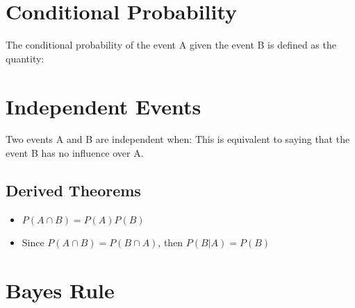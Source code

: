 \section{Conditional Probability}
The conditional probability of the event A given the event B is defined as the quantity:

\section{Independent Events}
Two events A and B are independent when:
 This is equivalent to saying that the event B has no influence over A.
\subsection{Derived Theorems}
\begin{itemize}
  \item $P(A \cap B) = P(A)P(B)$
  \item Since $P(A \cap B) = P(B \cap A)$, then $P(B|A) = P(B)$
\end{itemize}

\section{Bayes Rule}


% 
